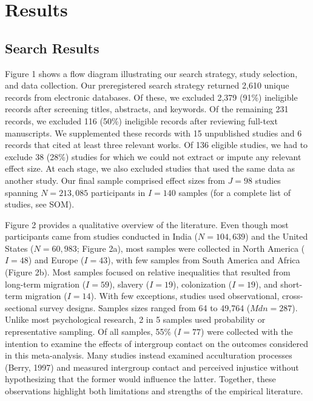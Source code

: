 \documentclass[12pt, letterpaper]{article}
\begin{document}
\hypertarget{results}{%
\section{Results}\label{results}}

\hypertarget{search-results}{%
\subsection{Search Results}\label{search-results}}

Figure 1 shows a flow diagram illustrating our search strategy, study
selection, and data collection. Our preregistered search strategy
returned 2,610 unique records from electronic databases. Of these, we
excluded 2,379 (91\%) ineligible records after screening titles,
abstracts, and keywords. Of the remaining 231 records, we excluded 116
(50\%) ineligible records after reviewing full-text manuscripts. We
supplemented these records with 15 unpublished studies and 6 records
that cited at least three relevant works. Of 136 eligible studies, we
had to exclude 38 (28\%) studies for which we could not extract or
impute any relevant effect size. At each stage, we also excluded studies
that used the same data as another study. Our final sample comprised
effect sizes from \(J = 98\) studies spanning \(N = 213,085\)
participants in \(I = 140\) samples (for a complete list of studies, see
SOM).

Figure 2 provides a qualitative overview of the literature. Even though
most participants came from studies conducted in India (\(N = 104,639\))
and the United States (\(N = 60,983\); Figure 2a), most samples were
collected in North America (\(I = 48\)) and Europe (\(I = 43\)), with
few samples from South America and Africa (Figure 2b). Most samples
focused on relative inequalities that resulted from long-term migration
(\(I = 59\)), slavery (\(I = 19\)), colonization (\(I = 19\)), and
short-term migration (\(I = 14\)). With few exceptions, studies used
observational, cross-sectional survey designs. Samples sizes ranged from
64 to 49,764 (\(\textit{Mdn} = 287\)). Unlike most psychological
research, 2 in 5 samples used probability or representative sampling. Of
all samples, 55\% (\(I = 77\)) were collected with the intention to
examine the effects of intergroup contact on the outcomes considered in
this meta-analysis. Many studies instead examined acculturation
processes (Berry, 1997) and measured intergroup contact and perceived
injustice without hypothesizing that the former would influence the
latter. Together, these observations highlight both limitations and
strengths of the empirical literature.
\end{document}
